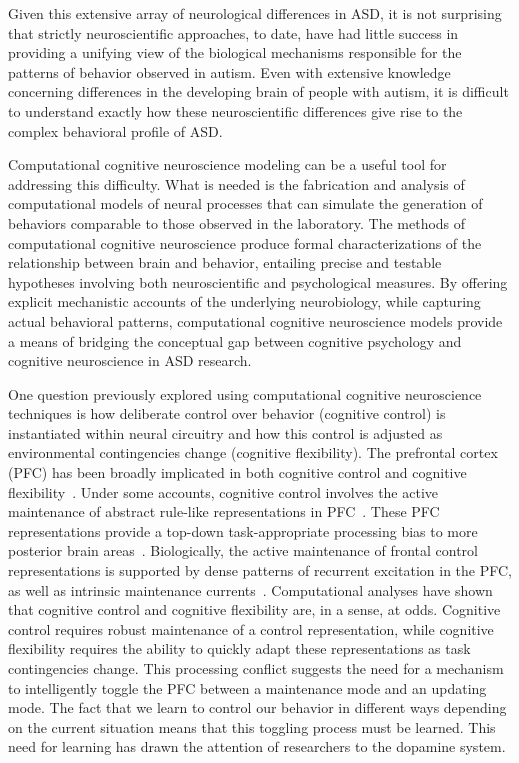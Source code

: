 Given this extensive array of neurological differences in ASD, it is not surprising that strictly neuroscientific approaches, to date, have had little success in providing a unifying view of the biological mechanisms responsible for the patterns of behavior observed in autism. Even with extensive knowledge concerning differences in the developing brain of people with autism, it is difficult to understand exactly how these neuroscientific differences give rise to the complex behavioral profile of ASD.

Computational cognitive neuroscience modeling can be a useful tool for addressing this difficulty. What is needed is the fabrication and analysis of computational models of neural processes that can simulate the generation of behaviors comparable to those observed in the laboratory. The methods of computational cognitive neuroscience produce formal characterizations of the relationship between brain and behavior, entailing precise and testable hypotheses involving both neuroscientific and psychological measures. By offering explicit mechanistic accounts of the underlying neurobiology, while capturing actual behavioral patterns, computational cognitive neuroscience models provide a means of bridging the conceptual gap between cognitive psychology and cognitive neuroscience in ASD research.

One question previously explored using computational cognitive neuroscience techniques is how deliberate control over behavior (cognitive control) is instantiated within neural circuitry and how this control is adjusted as environmental contingencies change (cognitive flexibility). The prefrontal cortex (PFC) has been broadly implicated in both cognitive control and cognitive flexibility~\cite{StussDT:2000:WCSTLesion,StussDT:2001:StroopLesion}. Under some accounts, cognitive control involves the active maintenance of abstract rule-like representations in PFC~\cite{NoelleDC:2012:Rules}. These PFC representations provide a top-down task-appropriate processing bias to more posterior brain areas~\cite{CohenJD:1990:Stroop,MillerEK:2001:PFC}. Biologically, the active maintenance of frontal control representations is supported by dense patterns of recurrent excitation in the PFC, as well as intrinsic maintenance currents~\cite{GoldmanRakicPS:1987:PFCMaintenance}. Computational analyses have shown that cognitive control and cognitive flexibility are, in a sense, at odds. Cognitive control requires robust maintenance of a control representation, while cognitive flexibility requires the ability to quickly adapt these representations as task contingencies change. This processing conflict suggests the need for a mechanism to intelligently toggle the PFC between a maintenance mode and an updating mode. The fact that we learn to control our behavior in different ways depending on the current situation means that this toggling process must be learned. This need for learning has drawn the attention of researchers to the dopamine system.   

